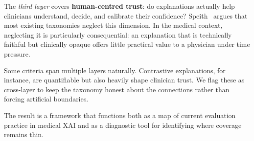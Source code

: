 The \emph{third layer} covers \textbf{human-centred trust}: do
explanations actually help clinicians understand, decide, and calibrate
their confidence? Speith~\cite{speith2022review} argues that most
existing taxonomies neglect this dimension. In the medical context,
neglecting it is particularly consequential: an explanation that is
technically faithful but clinically opaque offers little practical value
to a physician under time pressure.

Some criteria span multiple layers naturally. Contrastive explanations,
for instance, are quantifiable but also heavily shape clinician trust.
We flag these as cross-layer to keep the taxonomy honest about the
connections rather than forcing artificial boundaries.

The result is a framework that functions both as a map of current
evaluation practice in medical XAI and as a diagnostic tool for
identifying where coverage remains thin.


